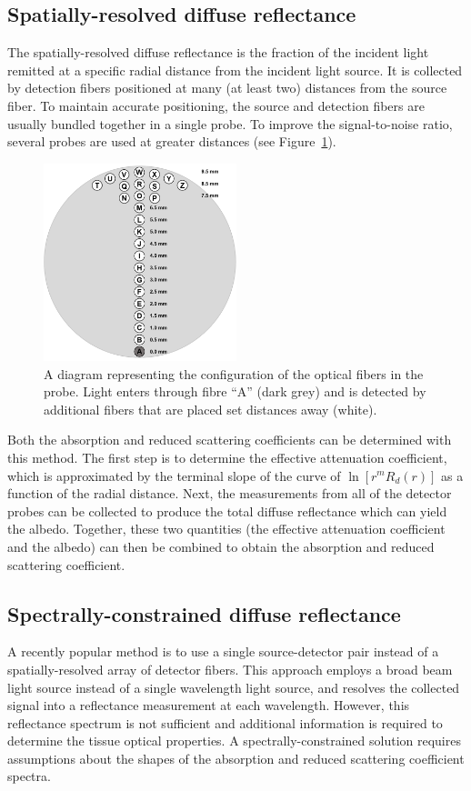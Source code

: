 \subsection{Spatially-resolved diffuse reflectance}
The spatially-resolved diffuse reflectance is the fraction of the incident light remitted at a specific radial distance from the incident light source. It is collected by detection fibers positioned at many (at least two) distances from the source fiber.\cite{Kim2011} To maintain accurate positioning, the source and detection fibers are usually bundled together in a single probe. To improve the signal-to-noise ratio, several probes are used at greater distances (see Figure~\ref{fig:intro-srdr}).

\begin{figure}
	\centering \includegraphics[width=0.5\textwidth]{figures/intro-srdr.png}
	\caption[Probe for spatially-resolved diffuse reflectance]{\label{fig:intro-srdr}A diagram representing the configuration of the optical fibers in the probe. Light enters through fibre “A” (dark grey) and is detected by additional fibers that are placed set distances away (white).}
\end{figure}

Both the absorption and reduced scattering coefficients can be determined with this method. The first step is to determine the effective attenuation coefficient, which is approximated by the terminal slope of the curve of $\ln[r^m R_d(r)] $ as a function of the radial distance. Next, the measurements from all of the detector probes can be collected to produce the total diffuse reflectance which can yield the albedo. Together, these two quantities (the effective attenuation coefficient and the albedo) can then be combined to obtain the absorption and reduced scattering coefficient.

\subsection{Spectrally-constrained diffuse reflectance}
A recently popular method is to use a single source-detector pair instead of a spatially-resolved array of detector fibers. This approach employs a broad beam light source instead of a single wavelength light source, and resolves the collected signal into a reflectance measurement at each wavelength. However, this reflectance spectrum is not sufficient and additional information is required to determine the tissue optical properties. A spectrally-constrained solution requires assumptions about the shapes of the absorption and reduced scattering coefficient spectra.

